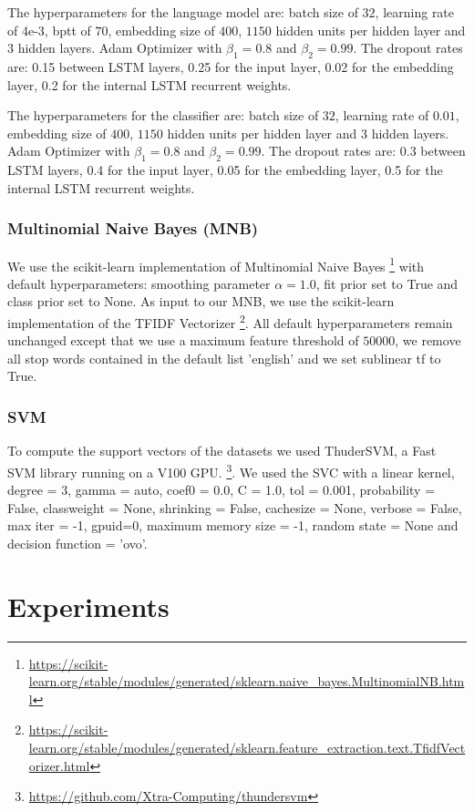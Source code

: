 \documentclass[11pt,a4paper]{article}
\begin{document}
The hyperparameters for the language model are: batch size of $32$, learning rate of 4e-3, bptt of $70$, embedding size of $400$, $1150$ hidden units per hidden layer and $3$ hidden layers. Adam Optimizer with $\beta_1=0.8$ and $\beta_2=0.99$. The dropout rates are: 0.15 between LSTM layers, 0.25 for the input layer, 0.02 for the embedding layer, 0.2 for the internal LSTM recurrent weights.  
        
The hyperparameters for the classifier are: batch size of $32$, learning rate of $0.01$, embedding size of $400$, $1150$ hidden units per hidden layer and $3$ hidden layers. Adam Optimizer with $\beta_1=0.8$ and $\beta_2=0.99$. The dropout rates are: 0.3 between LSTM layers, 0.4 for the input layer, 0.05 for the embedding layer, 0.5 for the internal LSTM recurrent weights.  

\subsubsection{Multinomial Naive Bayes (MNB)}
We use the scikit-learn implementation of Multinomial Naive Bayes \footnote{\url{https://scikit-learn.org/stable/modules/generated/sklearn.naive_bayes.MultinomialNB.html}} with default hyperparameters: smoothing parameter $\alpha=1.0$, fit prior set to True and class prior set to None. As input to our MNB, we use the scikit-learn implementation of the TFIDF Vectorizer \footnote{\url{https://scikit-learn.org/stable/modules/generated/sklearn.feature_extraction.text.TfidfVectorizer.html}}. All default hyperparameters remain unchanged except that we use a maximum feature threshold of $50000$, we remove all stop words contained in the default list 'english' and we set sublinear tf to True.

\subsubsection{SVM}
To compute the support vectors of the datasets we used ThuderSVM, a Fast SVM library running on a V100 GPU. \footnote{\url{https://github.com/Xtra-Computing/thundersvm}}. We used the SVC with a linear kernel, degree = 3, gamma = auto, coef0 = 0.0, C = 1.0, tol = 0.001, probability = False, classweight = None, shrinking = False, cachesize = None, verbose = False, max iter = -1, gpuid=0, maximum memory size = -1, random state = None and decision function = 'ovo'. 



\section{Experiments}
\end{document}
